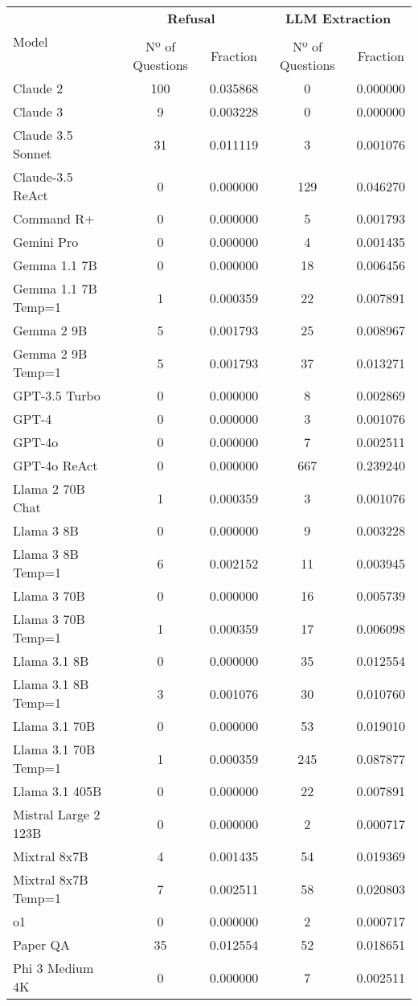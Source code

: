 \begin{tabular}{lcccc}
\toprule
\multirow{3}{*}{Model} & \multicolumn{2}{c}{\textbf{Refusal}} & \multicolumn{2}{c}{\textbf{LLM Extraction}}\\
\cmidrule(lr){2-3} \cmidrule(lr){4-5}\\
& Nº of Questions & Fraction & Nº of Questions & Fraction\\
\midrule
Claude 2 & 100 & 0.035868 & 0 & 0.000000 \\
Claude 3 & 9 & 0.003228 & 0 & 0.000000 \\
Claude 3.5 Sonnet & 31 & 0.011119 & 3 & 0.001076 \\
Claude-3.5 ReAct & 0 & 0.000000 & 129 & 0.046270 \\
Command R+ & 0 & 0.000000 & 5 & 0.001793 \\
Gemini Pro & 0 & 0.000000 & 4 & 0.001435 \\
Gemma 1.1 7B & 0 & 0.000000 & 18 & 0.006456 \\
Gemma 1.1 7B Temp=1 & 1 & 0.000359 & 22 & 0.007891 \\
Gemma 2 9B & 5 & 0.001793 & 25 & 0.008967 \\
Gemma 2 9B Temp=1 & 5 & 0.001793 & 37 & 0.013271 \\
GPT-3.5 Turbo & 0 & 0.000000 & 8 & 0.002869 \\
GPT-4 & 0 & 0.000000 & 3 & 0.001076 \\
GPT-4o & 0 & 0.000000 & 7 & 0.002511 \\
GPT-4o ReAct & 0 & 0.000000 & 667 & 0.239240 \\
Llama 2 70B Chat & 1 & 0.000359 & 3 & 0.001076 \\
Llama 3 8B & 0 & 0.000000 & 9 & 0.003228 \\
Llama 3 8B Temp=1 & 6 & 0.002152 & 11 & 0.003945 \\
Llama 3 70B & 0 & 0.000000 & 16 & 0.005739 \\
Llama 3 70B Temp=1 & 1 & 0.000359 & 17 & 0.006098 \\
Llama 3.1 8B & 0 & 0.000000 & 35 & 0.012554 \\
Llama 3.1 8B Temp=1 & 3 & 0.001076 & 30 & 0.010760 \\
Llama 3.1 70B & 0 & 0.000000 & 53 & 0.019010 \\
Llama 3.1 70B Temp=1 & 1 & 0.000359 & 245 & 0.087877 \\
Llama 3.1 405B & 0 & 0.000000 & 22 & 0.007891 \\
Mistral Large 2 123B & 0 & 0.000000 & 2 & 0.000717 \\
Mixtral 8x7B & 4 & 0.001435 & 54 & 0.019369 \\
Mixtral 8x7B Temp=1 & 7 & 0.002511 & 58 & 0.020803 \\
o1 & 0 & 0.000000 & 2 & 0.000717 \\
Paper QA & 35 & 0.012554 & 52 & 0.018651 \\
Phi 3 Medium 4K & 0 & 0.000000 & 7 & 0.002511 \\
\bottomrule
\end{tabular}
